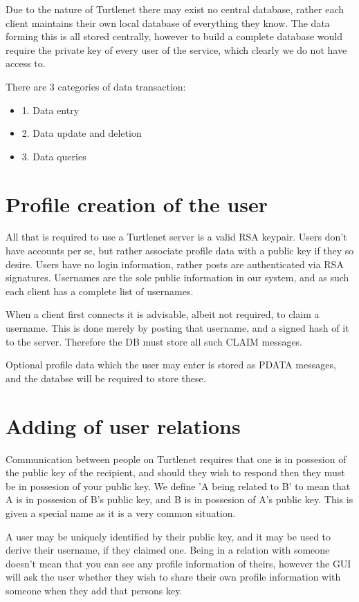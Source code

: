 Due to the nature of Turtlenet there may exist no central database, rather each
client maintains their own local database of everything they know. The data
forming this is all stored centrally, however to build a complete database would
require the private key of every user of the service, which clearly we do not
have access to.

There are 3 categories of data transaction:
\begin{itemize}
\item 1. Data entry
\item 2. Data update and deletion
\item 3. Data queries
\end{itemize}

\section{Profile creation of the user}
All that is required to use a Turtlenet server is a valid RSA keypair. Users
don't have accounts per se, but rather associate profile data with a public key
if they so desire. Users have no login information, rather posts are
authenticated via RSA signatures. Usernames are the sole public information in
our system, and as such each client has a complete list of usernames.

When a client first connects it is advisable, albeit not required, to claim a
username. This is done merely by posting that username, and a signed hash of it
to the server. Therefore the DB must store all such CLAIM messages.

Optional profile data which the user may enter is stored as PDATA messages, and
the databse will be required to store these.

\section{Adding of user relations}
Communication between people on Turtlenet requires that one is in possesion of
the public key of the recipient, and should they wish to respond then they must
be in possesion of your public key. We define 'A being related to B' to mean
that A is in possesion of B's public key, and B is in possesion of A's public
key. This is given a special name as it is a very common situation.

A user may be uniquely identified by their public key, and it may be used to
derive their username, if they claimed one. Being in a relation with someone
doesn't mean that you can see any profile information of theirs, however the
GUI will ask the user whether they wish to share their own profile information
with someone when they add that persons key.

